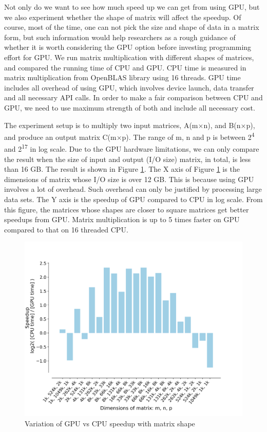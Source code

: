 \documentclass[9pt,twocolumn,twoside,lineno]{gsag3jnl}
\begin{document}
Not only do we want to see how much speed up we can get from using GPU, but we also experiment whether the shape of matrix will affect the speedup. 
Of course, most of the time, one can not pick the size and shape of data in a matrix form, 
but such information would help researchers as a rough guidance of whether it is worth considering the GPU option before investing programming effort for GPU. 
We run matrix multiplication with different shapes of matrices, and compared the running time of CPU and GPU. 
CPU time is measured in matrix multiplication from OpenBLAS library using 16 threads. 
GPU time includes all overhead of using GPU, which involves device launch, data transfer and all necessary API calls.
In order to make a fair comparison between CPU and GPU, we need to use maximum strength of both and include all necessary cost. 

The experiment setup is to multiply two input matrices, A(m$\times$n), and B(n$\times$p), and produce an output matrix C(m$\times$p).  
The range of m, n and p is between 2\textsuperscript{4} and 2\textsuperscript{17} in log scale.
Due to the GPU hardware limitations, we can only compare the result when the size of input and output (I/O size) matrix, in total, is less than 16 GB. 
The result is shown in Figure \ref{GPUCPUShape}. 
The X axis of Figure \ref{GPUCPUShape} is the dimensions of matrix whose I/O size is over 12 GB.
This is because using GPU involves a lot of overhead. 
Such overhead can only be justified by processing large data sets. 
The Y axis is the speedup of GPU compared to CPU in log scale.  
From this figure, the matrices whose shapes are closer to square matrices get better speedups from GPU.
Matrix multiplication is up to 5 times faster on GPU compared to that on 16 threaded CPU. 


\begin{figure}[!htb]
	\centering
	\caption{Variation of GPU vs CPU speedup with matrix shape
	}
	\label{GPUCPUShape}
	\includegraphics[scale = 0.35]{figs/speedup.png}
\end{figure} 
\end{document}
